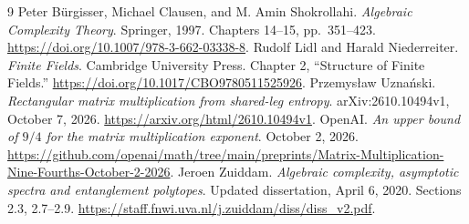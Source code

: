 \documentclass[11pt]{article}
\theoremstyle{remark}
\begin{document}
\begin{thebibliography}{9}
 Peter B\"urgisser, Michael Clausen, and M. Amin Shokrollahi.
\emph{Algebraic Complexity Theory}. Springer, 1997.
Chapters 14--15, pp.~351--423.
\url{https://doi.org/10.1007/978-3-662-03338-8}.
 Rudolf Lidl and Harald Niederreiter.
\emph{Finite Fields}. Cambridge University Press.
Chapter 2, ``Structure of Finite Fields.''
\url{https://doi.org/10.1017/CBO9780511525926}.
 Przemys\l aw Uzna\'nski.
\emph{Rectangular matrix multiplication from shared-leg entropy}.
arXiv:2610.10494v1, October 7, 2026.
\url{https://arxiv.org/html/2610.10494v1}.
 OpenAI.
\emph{An upper bound of $9/4$ for the matrix multiplication exponent}.
October 2, 2026.
\url{https://github.com/openai/math/tree/main/preprints/Matrix-Multiplication-Nine-Fourths-October-2-2026}.
 Jeroen Zuiddam.
\emph{Algebraic complexity, asymptotic spectra and entanglement polytopes}.
Updated dissertation, April 6, 2020. Sections 2.3, 2.7--2.9.
\url{https://staff.fnwi.uva.nl/j.zuiddam/diss/diss_v2.pdf}.
\end{thebibliography}
\end{document}
